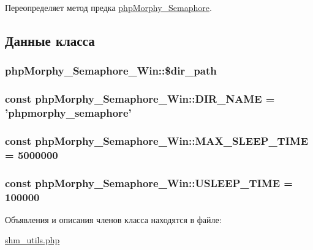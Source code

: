 Переопределяет метод предка \hyperlink{classphpMorphy__Semaphore_acec635ad99b21b4f7ab6df94d2c7915b}{phpMorphy\_\-Semaphore}.



\subsection{Данные класса}
\hypertarget{classphpMorphy__Semaphore__Win_ae0ab814f2111d8348ff1f9d7882054d2}{
\subsubsection[{\$dir\_\-path}]{\setlength{\rightskip}{0pt plus 5cm}phpMorphy\_\-Semaphore\_\-Win::\$dir\_\-path}}
\label{classphpMorphy__Semaphore__Win_ae0ab814f2111d8348ff1f9d7882054d2}
\hypertarget{classphpMorphy__Semaphore__Win_ad73b3c535ed20b9a350dcea2123250ac}{
\subsubsection[{DIR\_\-NAME}]{\setlength{\rightskip}{0pt plus 5cm}const {\bf phpMorphy\_\-Semaphore\_\-Win::DIR\_\-NAME} = 'phpmorphy\_\-semaphore'}}
\label{classphpMorphy__Semaphore__Win_ad73b3c535ed20b9a350dcea2123250ac}
\hypertarget{classphpMorphy__Semaphore__Win_a4f13df681228ae25952138822d85586a}{
\subsubsection[{MAX\_\-SLEEP\_\-TIME}]{\setlength{\rightskip}{0pt plus 5cm}const {\bf phpMorphy\_\-Semaphore\_\-Win::MAX\_\-SLEEP\_\-TIME} = 5000000}}
\label{classphpMorphy__Semaphore__Win_a4f13df681228ae25952138822d85586a}
\hypertarget{classphpMorphy__Semaphore__Win_a6afe18891fb3f4d4ad8850f369a11091}{
\subsubsection[{USLEEP\_\-TIME}]{\setlength{\rightskip}{0pt plus 5cm}const {\bf phpMorphy\_\-Semaphore\_\-Win::USLEEP\_\-TIME} = 100000}}
\label{classphpMorphy__Semaphore__Win_a6afe18891fb3f4d4ad8850f369a11091}


Объявления и описания членов класса находятся в файле:\begin{DoxyCompactItemize}
\item 
\hyperlink{shm__utils_8php}{shm\_\-utils.php}\end{DoxyCompactItemize}
